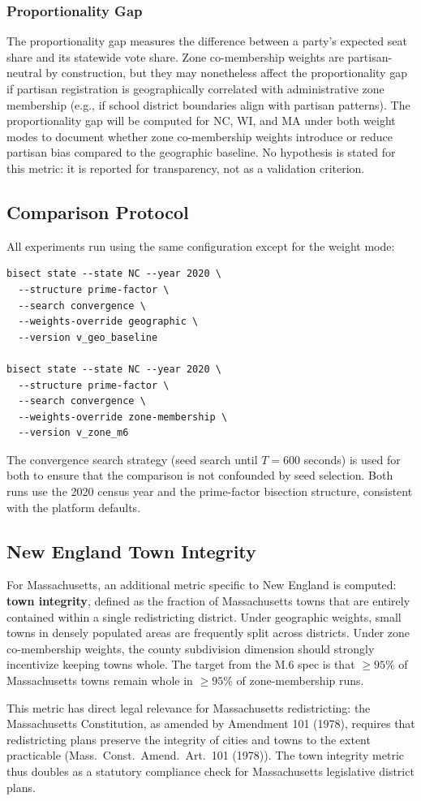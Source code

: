 \subsubsection{Proportionality Gap}

The proportionality gap measures the difference between a party's expected seat share
and its statewide vote share.
Zone co-membership weights are partisan-neutral by construction, but they may
nonetheless affect the proportionality gap if partisan registration is geographically
correlated with administrative zone membership (e.g., if school district boundaries
align with partisan patterns).
The proportionality gap will be computed for NC, WI, and MA under both weight modes
to document whether zone co-membership weights introduce or reduce partisan bias
compared to the geographic baseline.
No hypothesis is stated for this metric: it is reported for transparency, not as a
validation criterion.

\subsection{Comparison Protocol}

All experiments run using the same configuration except for the weight mode:
\begin{verbatim}
bisect state --state NC --year 2020 \
  --structure prime-factor \
  --search convergence \
  --weights-override geographic \
  --version v_geo_baseline

bisect state --state NC --year 2020 \
  --structure prime-factor \
  --search convergence \
  --weights-override zone-membership \
  --version v_zone_m6
\end{verbatim}

The convergence search strategy (seed search until $T = 600$ seconds) is used
for both to ensure that the comparison is not confounded by seed selection.
Both runs use the 2020 census year and the prime-factor bisection structure,
consistent with the platform defaults.

\subsection{New England Town Integrity}

For Massachusetts, an additional metric specific to New England is computed:
\textbf{town integrity}, defined as the fraction of Massachusetts towns that are
entirely contained within a single redistricting district.
Under geographic weights, small towns in densely populated areas are frequently
split across districts.
Under zone co-membership weights, the county subdivision dimension should strongly
incentivize keeping towns whole.
The target from the M.6 spec is that $\geq 95\%$ of Massachusetts towns remain
whole in $\geq 95\%$ of zone-membership runs.

This metric has direct legal relevance for Massachusetts redistricting: the
Massachusetts Constitution, as amended by Amendment 101 (1978), requires that
redistricting plans preserve the integrity of cities and towns to the extent
practicable (Mass.\ Const.\ Amend.\ Art.\ 101 (1978)).
The town integrity metric thus doubles as a statutory compliance check for
Massachusetts legislative district plans.
